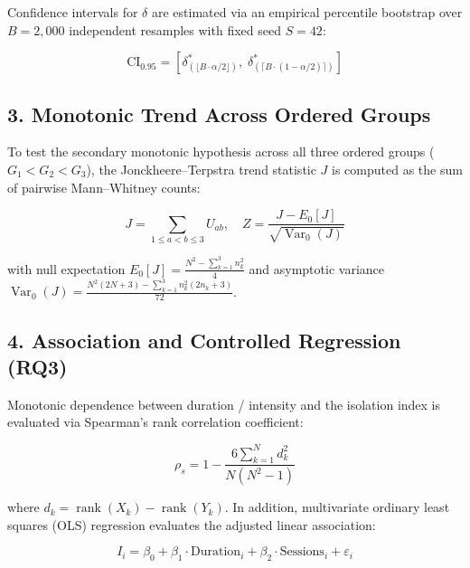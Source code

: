 Confidence intervals for $\delta$ are estimated via an empirical percentile bootstrap over $B = 2{,}000$ independent resamples with fixed seed $S = 42$:

\begin{equation}
\text{CI}_{0.95} = \left[ \delta^*_{(\lfloor B \cdot \alpha/2 \rfloor)}, \; \delta^*_{(\lceil B \cdot (1 - \alpha/2) \rceil)} \right]
\label{eq:bootstrap_ci}
\end{equation}

\subsection*{3. Monotonic Trend Across Ordered Groups}

To test the secondary monotonic hypothesis across all three ordered groups ($G_1 < G_2 < G_3$), the Jonckheere--Terpstra trend statistic $J$ is computed as the sum of pairwise Mann--Whitney counts:

\begin{equation}
J = \sum_{1 \le a < b \le 3} U_{ab}, \quad Z = \frac{J - E_0[J]}{\sqrt{\operatorname{Var}_0(J)}}
\label{eq:jonckheere}
\end{equation}

\noindent with null expectation $E_0[J] = \frac{N^2 - \sum_{k=1}^3 n_k^2}{4}$ and asymptotic variance $\operatorname{Var}_0(J) = \frac{N^2(2N+3) - \sum_{k=1}^3 n_k^2(2n_k+3)}{72}$.

\subsection*{4. Association and Controlled Regression (RQ3)}

Monotonic dependence between duration / intensity and the isolation index is evaluated via Spearman's rank correlation coefficient:

\begin{equation}
\rho_s = 1 - \frac{6 \sum_{k=1}^N d_k^2}{N(N^2 - 1)}
\label{eq:spearman}
\end{equation}

\noindent where $d_k = \operatorname{rank}(X_k) - \operatorname{rank}(Y_k)$. In addition, multivariate ordinary least squares (OLS) regression evaluates the adjusted linear association:

\begin{equation}
I_i = \beta_0 + \beta_1 \cdot \text{Duration}_i + \beta_2 \cdot \text{Sessions}_i + \varepsilon_i
\label{eq:regression}
\end{equation}
